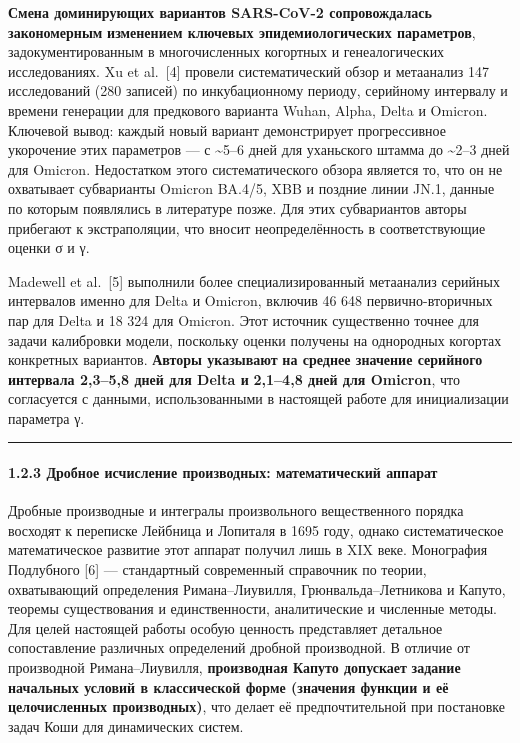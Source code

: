 \documentclass[12pt]{article}
\begin{document}
\textbf{Смена доминирующих вариантов SARS-CoV-2 сопровождалась
закономерным} \textbf{изменением ключевых эпидемиологических
параметров}, задокументированным в многочисленных когортных и
генеалогических исследованиях. Xu et al.~{[}4{]} провели систематический
обзор и метаанализ 147 исследований (280 записей) по инкубационному
периоду, серийному интервалу и времени генерации для предкового варианта
Wuhan, Alpha, Delta и Omicron. Ключевой вывод: каждый новый вариант
демонстрирует прогрессивное укорочение этих параметров --- с
\textasciitilde5--6 дней для уханьского штамма до \textasciitilde2--3
дней для Omicron. Недостатком этого систематического обзора является то,
что он не охватывает субварианты Omicron BA.4/5, XBB и поздние линии
JN.1, данные по которым появлялись в литературе позже. Для этих
субвариантов авторы прибегают к экстраполяции, что вносит
неопределённость в соответствующие оценки σ и γ.

Madewell et al.~{[}5{]} выполнили более специализированный метаанализ
серийных интервалов именно для Delta и Omicron, включив 46 648
первично-вторичных пар для Delta и 18 324 для Omicron. Этот источник
существенно точнее для задачи калибровки модели, поскольку оценки
получены на однородных когортах конкретных вариантов. \textbf{Авторы
указывают} \textbf{на среднее значение серийного интервала 2,3--5,8 дней
для Delta и} \textbf{2,1--4,8 дней для Omicron}, что согласуется с
данными, использованными в настоящей работе для инициализации параметра
γ.

\begin{center}\rule{0.5\linewidth}{0.5pt}\end{center}

\paragraph{1.2.3 Дробное исчисление производных: математический
аппарат}\label{ux434ux440ux43eux431ux43dux43eux435-ux438ux441ux447ux438ux441ux43bux435ux43dux438ux435-ux43fux440ux43eux438ux437ux432ux43eux434ux43dux44bux445-ux43cux430ux442ux435ux43cux430ux442ux438ux447ux435ux441ux43aux438ux439-ux430ux43fux43fux430ux440ux430ux442}

Дробные производные и интегралы произвольного вещественного порядка
восходят к переписке Лейбница и Лопиталя в 1695 году, однако
систематическое математическое развитие этот аппарат получил лишь в XIX
веке. Монография Подлубного {[}6{]} --- стандартный современный
справочник по теории, охватывающий определения Римана--Лиувилля,
Грюнвальда--Летникова и Капуто, теоремы существования и единственности,
аналитические и численные методы. Для целей настоящей работы особую
ценность представляет детальное сопоставление различных определений
дробной производной. В отличие от производной Римана--Лиувилля,
\textbf{производная Капуто допускает} \textbf{задание начальных условий
в классической форме (значения функции и её} \textbf{целочисленных
производных)}, что делает её предпочтительной при постановке задач Коши
для динамических систем.
\end{document}
